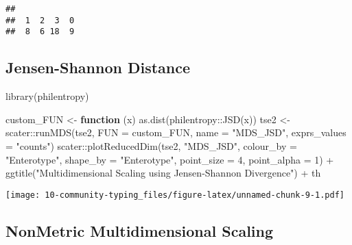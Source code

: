 \documentclass[
  oneside]{book}
\newenvironment{Shaded}{\begin{snugshade}}{\end{snugshade}}
\newcommand{\AttributeTok}[1]{\textcolor[rgb]{0.77,0.63,0.00}{#1}}
\newcommand{\ControlFlowTok}[1]{\textcolor[rgb]{0.13,0.29,0.53}{\textbf{#1}}}
\newcommand{\DecValTok}[1]{\textcolor[rgb]{0.00,0.00,0.81}{#1}}
\newcommand{\FunctionTok}[1]{\textcolor[rgb]{0.00,0.00,0.00}{#1}}
\newcommand{\NormalTok}[1]{#1}
\newcommand{\OtherTok}[1]{\textcolor[rgb]{0.56,0.35,0.01}{#1}}
\newcommand{\SpecialCharTok}[1]{\textcolor[rgb]{0.00,0.00,0.00}{#1}}
\newcommand{\StringTok}[1]{\textcolor[rgb]{0.31,0.60,0.02}{#1}}
\begin{document}
\begin{verbatim}
## 
##  1  2  3  0 
##  8  6 18  9
\end{verbatim}

\hypertarget{jensen-shannon-distance}{%
\subsection{Jensen-Shannon Distance}\label{jensen-shannon-distance}}

\begin{Shaded}
\begin{Highlighting}[]
\FunctionTok{library}\NormalTok{(philentropy)}

\NormalTok{custom\_FUN }\OtherTok{\textless{}{-}} \ControlFlowTok{function}\NormalTok{ (x) }\FunctionTok{as.dist}\NormalTok{(philentropy}\SpecialCharTok{::}\FunctionTok{JSD}\NormalTok{(x))}
\NormalTok{tse2 }\OtherTok{\textless{}{-}}\NormalTok{ scater}\SpecialCharTok{::}\FunctionTok{runMDS}\NormalTok{(tse2, }\AttributeTok{FUN =}\NormalTok{ custom\_FUN, }\AttributeTok{name =} \StringTok{"MDS\_JSD"}\NormalTok{, }\AttributeTok{exprs\_values =} \StringTok{"counts"}\NormalTok{)}
\NormalTok{scater}\SpecialCharTok{::}\FunctionTok{plotReducedDim}\NormalTok{(tse2, }\StringTok{"MDS\_JSD"}\NormalTok{, }\AttributeTok{colour\_by =} \StringTok{"Enterotype"}\NormalTok{, }
                       \AttributeTok{shape\_by =} \StringTok{"Enterotype"}\NormalTok{, }\AttributeTok{point\_size =} \DecValTok{4}\NormalTok{, }\AttributeTok{point\_alpha =} \DecValTok{1}\NormalTok{) }\SpecialCharTok{+}
                       \FunctionTok{ggtitle}\NormalTok{(}\StringTok{"Multidimensional Scaling using Jensen{-}Shannon Divergence"}\NormalTok{) }\SpecialCharTok{+}\NormalTok{ th}
\end{Highlighting}
\end{Shaded}

\texttt{[image: 10-community-typing\_files/figure-latex/unnamed-chunk-9-1.pdf]}

\hypertarget{nonmetric-multidimensional-scaling}{%
\subsection{NonMetric Multidimensional Scaling}\label{nonmetric-multidimensional-scaling}}
\end{document}
